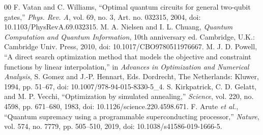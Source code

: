 \documentclass[conference]{IEEEtran}
\begin{document}
\begin{thebibliography}{00}
 F. Vatan and C. Williams, ``Optimal quantum circuits for general two-qubit gates,'' \textit{Phys. Rev. A}, vol. 69, no. 3, Art. no. 032315, 2004, doi: 10.1103/PhysRevA.69.032315.
 M. A. Nielsen and I. L. Chuang, \textit{Quantum Computation and Quantum Information}, 10th anniversary ed. Cambridge, U.K.: Cambridge Univ. Press, 2010, doi: 10.1017/CBO9780511976667.
 M. J. D. Powell, ``A direct search optimization method that models the objective and constraint functions by linear interpolation,'' in \textit{Advances in Optimization and Numerical Analysis}, S. Gomez and J.-P. Hennart, Eds. Dordrecht, The Netherlands: Kluwer, 1994, pp. 51--67, doi: 10.1007/978-94-015-8330-5\_4.
 S. Kirkpatrick, C. D. Gelatt, and M. P. Vecchi, ``Optimization by simulated annealing,'' \textit{Science}, vol. 220, no. 4598, pp. 671--680, 1983, doi: 10.1126/science.220.4598.671.
 F. Arute \textit{et al.}, ``Quantum supremacy using a programmable superconducting processor,'' \textit{Nature}, vol. 574, no. 7779, pp. 505--510, 2019, doi: 10.1038/s41586-019-1666-5.
\end{thebibliography}
\end{document}
